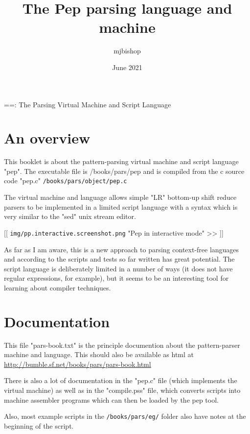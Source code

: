 \documentclass[a4paper,12pt]{article}
\title{The Pep parsing language and machine}
\author{mjbishop}
\date{June 2021}
\begin{document}
  

  ==: The Parsing Virtual Machine and Script Language

\section{An overview}

 This booklet is about the pattern-parsing virtual machine and script
 language "pep". The executable file is /books/pars/pep and is compiled
 from the c source code "pep.c" \texttt{/books/pars/object/pep.c}

 The virtual machine and language allows simple "LR" bottom-up shift
 reduce parsers to be implemented in a limited script language with
 a syntax which is very similar to the "sed" unix stream editor.

 [[ \texttt{img/pp.interactive.screenshot.png} "Pep in interactive mode" >> ]]

 As far as I am aware, this is a new approach to parsing context-free
 languages and according to the scripts and tests so far written has
 great potential. The script language is deliberately limited in
 a number of ways (it does not have regular expressions, for example), but
 it seems to be an interesting tool for learning about compiler techniques.

\section{Documentation}

 This file "pars-book.txt" is the principle documention about the
 pattern-parser machine and language. This should also be available
 as html at \url{http://bumble.sf.net/books/pars/pars-book.html}

 There is also a lot of documentation in the "pep.c" file (which implements
 the virtual machine) as well as in the "compile.pss" file, which converts
 scripts into machine assembler programs which can then be loaded by the
 pep tool.
 
 Also, most example scripts in the \texttt{/books/pars/eg/} folder also have
 notes at the beginning of the script.
\end{document}
